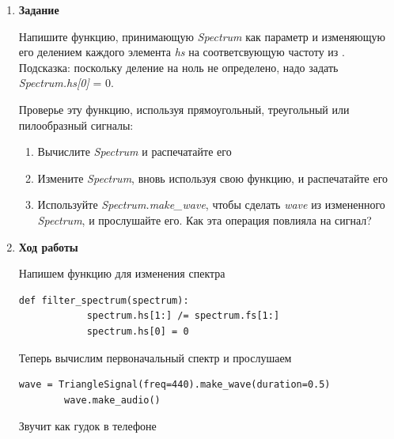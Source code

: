 \documentclass[a4paper,12pt]{article}
\begin{document}
\begin{enumerate}
	
	\item \textbf{Задание}
	
	Напишите функцию, принимающую \textit{Spectrum} как параметр и изменяющую его делением каждого элемента \textit{hs} на соответсвующую частоту из . Подсказка: поскольку деление на ноль не определено, надо задать \textit{Spectrum.hs[0]} = 0.
	
	Проверье эту функцию, используя прямоугольный, треугольный или пилообразный сигналы:
	
	\begin{enumerate}
		
		\item Вычислите \textit{Spectrum} и распечатайте его
		
		\item Измените \textit{Spectrum}, вновь используя свою функцию, и распечатайте его
		
		\item Используйте \textit{Spectrum.make\_wave}, чтобы сделать \textit{wave} из измененного \textit{Spectrum}, и прослушайте его. Как эта операция повлияла на сигнал?
		
	\end{enumerate}
	
	\item \textbf{Ход работы}
	
	Напишем функцию для изменения спектра
	\begin{lstlisting}[caption=Функция для изменения спектра]
		def filter_spectrum(spectrum):
			spectrum.hs[1:] /= spectrum.fs[1:]
			spectrum.hs[0] = 0
	\end{lstlisting}
	
	Теперь вычислим первоначальный спектр и прослушаем
	\begin{lstlisting}[caption=Вычисление первоначального спектра и его прослушивание]
		wave = TriangleSignal(freq=440).make_wave(duration=0.5)
		wave.make_audio()
	\end{lstlisting}
	Звучит как гудок в телефоне
	

\end{enumerate}
\end{document}
